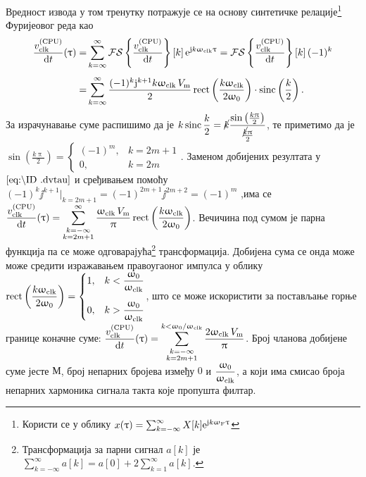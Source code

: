     Вредност извода у том тренутку потражује се на основу синтетичке релације\footnote{
    Користи се у облику $x(\uptau) = \sum_{k = -\infty}^{\infty} X[k] {\rm e}^{{\rm j} k\upomega_{\rm F} \uptau}$
    } Фуријеовог реда као 
    \begin{align}
        \dfrac{v_{\rm clk}^{\rm (CPU)}}{\de t}  (\uptau)
        =& 
        \sum_{k = \infty}^{\infty} 
        \FS{ \dfrac{v_{\rm clk}^{\rm (CPU)}}{\de t} }[k] \, \ee^{\jj k \upomega_{\rm clk} \uptau} 
        = 
        \FS{ \dfrac{v_{\rm clk}^{\rm (CPU)}}{\de t} }[k] \, (-1)^k \\[1.5mm]
        =&
        \sum_{k = \infty}^{\infty} 
        \dfrac{ 
        (-1)^k \jj^{k+1} k \upomega_{\rm clk} \, 
        V_{\rm m} }{2}
        \rect \left( \dfrac{k{\upomega_{\rm clk}}}{2\upomega_0} \right) 
        \cdot
        \sinc \left(
        \dfrac{k}{2} \right). \label{eq:\ID.dvtau}
    \end{align}
    За израчунавање суме распишимо да је 
    $k \operatorname{sinc}\dfrac{k}{2} = 
    \cancel{k} \dfrac{\sin\left( \frac{k\uppi}{2} \right) }{ \frac{\cancel{k}\uppi}{2} }
    $, те приметимо да је \linebreak
    ${\sin\left( \frac{k\uppi}{2} \right) = 
    \begin{cases}
        (-1)^m ,&  k = 2m+1 \\
        0      ,& k = 2m
    \end{cases}}$. Заменом добијених резултата  
    у $\eqref{eq:\ID.dvtau}$ и сређивањем помоћу 
    $ (-1)^k \jj^{k+1} \bigg|_{k = 2m+1} = 
    (-1)^{2m + 1} \jj^{2m + 2} = (-1)^m
    $
    ,има се 
    $
        \dfrac{v_{\rm clk}^{\rm (CPU)}}{{\rm d} t}  (\uptau)
        = \displaystyle
        \sum_{\substack{ k = -\infty \\ k = 2m + 1 } }^{\infty} 
        \dfrac{ 
        \upomega_{\rm clk} \, 
        V_{\rm m} }{\uppi}
        \operatorname{rect} \left( \dfrac{{k \upomega_{\rm clk}}}{2\upomega_0} \right)  
    $. Вечичина под сумом је парна функција па се може одговарајућа\footnote{
        Трансформација за парни сигнал $a[k]$ је 
        $\sum_{k = -\infty}^{\infty} a[k] = a[0] + 2\sum_{k = 1}^{\infty} a[k]$.
    }
    трансформација. Добијена сума се онда може
    може средити изражавањем правоугаоног импулса у облику
    $
        \operatorname{rect} \left( \dfrac{{k \upomega_{\rm clk}}}{2\upomega_0} \right)
        =
        \begin{cases}
            1,& k < \dfrac{\upomega_{\rm 0}}{\upomega_{\rm clk}} \\[5mm]
            0,& k > \dfrac{\upomega_{\rm 0}}{\upomega_{\rm clk}} 
        \end{cases}
    $, што се може искористити за постављање горње границе коначне суме:
    $
        \dfrac{v_{\rm clk}^{\rm (CPU)}}{{\rm d} t}  (\uptau)
        = \displaystyle
        \sum_{\substack{ k = -\infty \\ k = 2m + 1 } }^{k < \upomega_0 / \upomega_{\rm clk} } 
        \dfrac{ 2
        \upomega_{\rm clk} \, 
        V_{\rm m} }{\uppi} 
    $. Број чланова добијене суме јесте $М$, број непарних бројева између $0$ и 
    $\dfrac{\upomega_0}{\upomega_{\rm clk}}$, а који има смисао   
    броја непарних хармоника сигнала такта које пропушта филтар.  
    \\[2mm]
    
